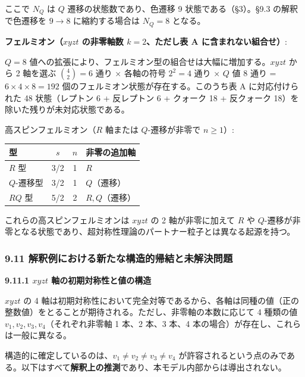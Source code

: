 \documentclass[
  a4paper,11pt]{ltjsarticle}
\newcounter{none}
\theoremstyle{definition}
\theoremstyle{remark}
\begin{document}
ここで \(N_Q\) は \(Q\) 遷移の状態数であり、色遷移 9
状態である（§3）。§9.3 の解釈で色遷移を \(9 \to 8\) に縮約する場合は
\(N_Q = 8\) となる。

\textbf{フェルミオン（\(xyzt\) の非零軸数 \(k = 2\)、ただし表 A
に含まれない組合せ）}:

\(Q = 8\)
値への拡張により、フェルミオン型の組合せは大幅に増加する。\(xyzt\) から
2 軸を選ぶ \(\binom{4}{2} = 6\) 通り × 各軸の符号 \(2^2 = 4\) 通り ×
\(Q\) 値 8 通り = \(6 \times 4 \times 8 = 192\)
個のフェルミオン状態が存在する。このうち表 A に対応付けられた 48
状態（レプトン 6 + 反レプトン 6 + クォーク 18 + 反クォーク
18）を除いた残りが未対応状態である。

高スピンフェルミオン（\(R\) 軸または \(Q\)-遷移が非零で \(n \geq 1\)）:

{\def\LTcaptype{none} %
\begin{longtable}[]{@{}lccl@{}}
\toprule\noalign{}
型 & \(s\) & \(n\) & 非零の追加軸 \\
\midrule\noalign{}
\endhead
\bottomrule\noalign{}
\endlastfoot
\(R\) 型 & 3/2 & 1 & \(R\) \\
\(Q\)-遷移型 & 3/2 & 1 & \(Q\)（遷移） \\
\(RQ\) 型 & 5/2 & 2 & \(R, Q\)（遷移） \\
\end{longtable}
}

これらの高スピンフェルミオンは \(xyzt\) の 2 軸が非零に加えて \(R\) や
\(Q\)-遷移が非零となる状態であり、超対称性理論のパートナー粒子とは異なる起源を持つ。

\subsubsection{9.11
解釈例における新たな構造的帰結と未解決問題}\label{ux89e3ux91c8ux4f8bux306bux304aux3051ux308bux65b0ux305fux306aux69cbux9020ux7684ux5e30ux7d50ux3068ux672aux89e3ux6c7aux554fux984c}

\textbf{9.11.1 \(xyzt\) 軸の初期対称性と値の構造}

\(xyzt\) の 4
軸は初期対称性において完全対等であるから、各軸は同種の値（正の整数値）をとることが期待される。ただし、非零軸の本数に応じて
4 種類の値 \(v_1, v_2, v_3, v_4\)（それぞれ非零軸 1 本、2 本、3 本、4
本の場合）が存在し、これらは一般に異なる。

構造的に確定しているのは、\(v_1 \neq v_2 \neq v_3 \neq v_4\)
が許容されるという点のみである。以下はすべて\textbf{解釈上の推測}であり、本モデル内部からは導出されない。
\end{document}
